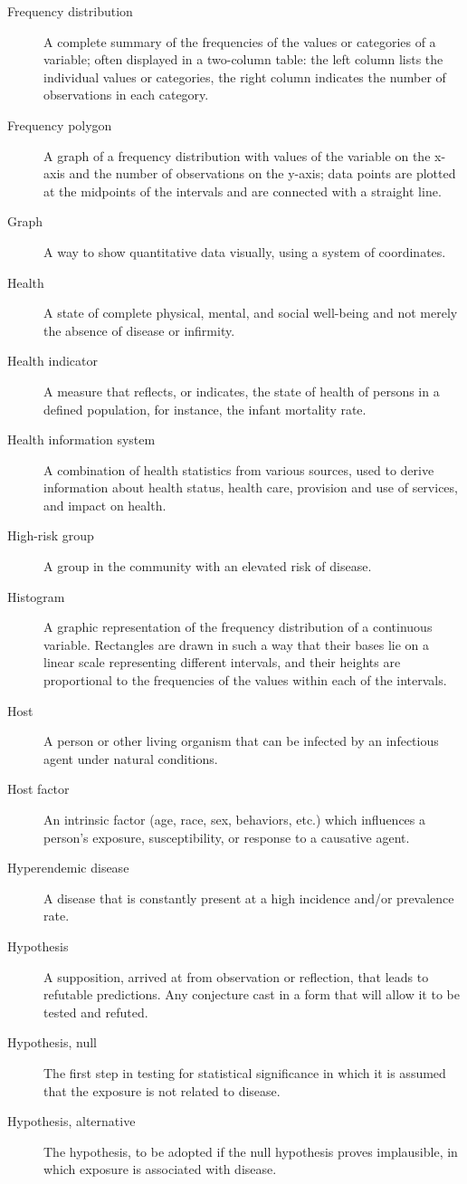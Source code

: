 \documentclass[11pt]{article}
\begin{document}
\begin{description}
\item[Frequency distribution] A complete summary of the
frequencies of the values or categories of a variable; often
displayed in a two-column table: the left column lists the
individual values or categories, the right column indicates the
number of observations in each category.
\item[Frequency polygon] A graph of a frequency distribution with
values of the variable on the x-axis and the number of
observations on the y-axis; data points are plotted at the
midpoints of the intervals and are connected with a straight
line.
\item[Graph] A way to show quantitative data visually, using a
system of coordinates.
\item[Health] A state of complete physical, mental, and social
well-being and not merely the absence of disease or infirmity.
\item[Health indicator] A measure that reflects, or indicates,
the state of health of persons in a defined population, for
instance, the infant mortality rate.
\item[Health information system] A combination of health
statistics from various sources, used to derive information
about health status, health care, provision and use of services,
and impact on health.
\item[High-risk group] A group in the community with an elevated
risk of disease.
\item[Histogram] A graphic representation of the frequency
distribution of a continuous variable. Rectangles are drawn in
such a way that their bases lie on a linear scale representing
different intervals, and their heights are proportional to the
frequencies of the values within each of the intervals.
\item[Host] A person or other living organism that can be
infected by an infectious agent under natural conditions.
\item[Host factor] An intrinsic factor (age, race, sex,
behaviors, etc.) which influences a person's exposure,
susceptibility, or response to a causative agent.
\item[Hyperendemic disease] A disease that is constantly present
at a high incidence and/or prevalence rate.
\item[Hypothesis] A supposition, arrived at from observation or
reflection, that leads to refutable predictions. Any conjecture
cast in a form that will allow it to be tested and refuted.
\item[Hypothesis, null] The first step in testing for statistical
significance in which it is assumed that the exposure is not
related to disease.
\item[Hypothesis, alternative] The hypothesis, to be adopted if
the null hypothesis proves implausible, in which exposure is
associated with disease.
\end{description}
\end{document}
